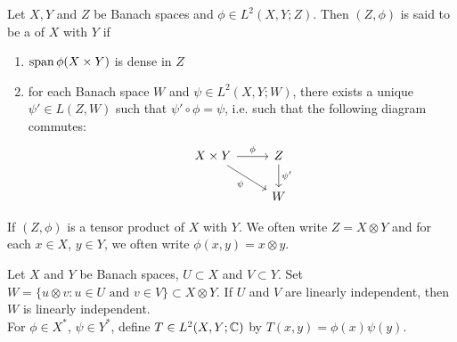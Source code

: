 \documentclass{book}
\begin{document}
	\begin{defn}
	Let $X, Y$ and $Z$ be Banach spaces and $\phi \in L^2(X,Y ; Z) $. Then $(Z, \phi)$ is said to be a  of $X$ with $Y$ if 
	\begin{enumerate}
	\item $\operatorname{span} \phi(X \times Y)$ is dense in $Z$
	\item for each Banach space $W$ and $\psi \in L^2(X,Y;W)$, there exists a unique $\psi' \in L(Z, W)$ such that $\psi' \circ \phi = \psi$, i.e. such that the following diagram commutes: 
	\[ \begin{tikzcd}
	X \times Y \arrow[r, "\phi"] \arrow[dr, "\psi"'] 	
	& Z  \arrow[d, "\psi'"] \\
	& W 
\end{tikzcd}
	\]
	\end{enumerate}
	If $(Z, \phi)$ is a tensor product of $X$ with $Y$. We often write $Z = X \otimes Y$ and for each $x\in X$, $y \in Y$, we often write $\phi(x,y) = x \otimes y$.
	\end{defn}	
	
	\begin{ex}
	Let $X$ and $Y$ be Banach spaces, $U \subset X$ and $V \subset Y$. Set $W = \{u \otimes v: u \in U \text{ and } v \in V\} \subset X \otimes Y$. If $U$ and $V$ are linearly independent, then $W$ is linearly independent.\\
	 For $\phi \in X^*$, $\psi \in Y^*$, define $T \in L^2(X, Y; \mathbb{C})$ by $T(x,y) = \phi(x)\psi(y)$.
	\end{ex}	
	
\end{document}
